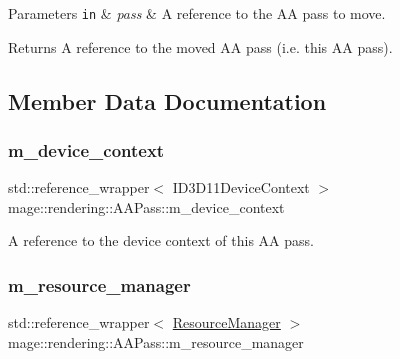 \begin{DoxyParams}[1]{Parameters}
\mbox{\tt in}  & {\em pass} & A reference to the AA pass to move. \\
\hline
\end{DoxyParams}
\begin{DoxyReturn}{Returns}
A reference to the moved AA pass (i.\+e. this AA pass). 
\end{DoxyReturn}


\subsection{Member Data Documentation}
\hypertarget{classmage_1_1rendering_1_1_a_a_pass_ae5421af4d2de6128ae24f4c6d5179c81}{}\label{classmage_1_1rendering_1_1_a_a_pass_ae5421af4d2de6128ae24f4c6d5179c81} 
\subsubsection{\texorpdfstring{m\+\_\+device\+\_\+context}{m\_device\_context}}
{\footnotesize\ttfamily std\+::reference\+\_\+wrapper$<$ I\+D3\+D11\+Device\+Context $>$ mage\+::rendering\+::\+A\+A\+Pass\+::m\+\_\+device\+\_\+context\hspace{0.3cm}{\ttfamily [private]}}

A reference to the device context of this AA pass. \hypertarget{classmage_1_1rendering_1_1_a_a_pass_aaffba9ba685e4723220a6c04834f6d2f}{}\label{classmage_1_1rendering_1_1_a_a_pass_aaffba9ba685e4723220a6c04834f6d2f} 
\subsubsection{\texorpdfstring{m\+\_\+resource\+\_\+manager}{m\_resource\_manager}}
{\footnotesize\ttfamily std\+::reference\+\_\+wrapper$<$ \hyperlink{classmage_1_1rendering_1_1_resource_manager}{Resource\+Manager} $>$ mage\+::rendering\+::\+A\+A\+Pass\+::m\+\_\+resource\+\_\+manager\hspace{0.3cm}{\ttfamily [private]}}

